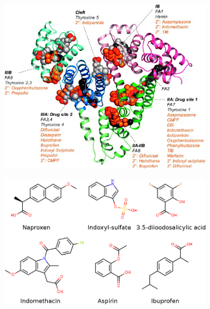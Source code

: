 \documentclass[10pt,final]{article}
\begin{document}
\begin{figure}[H]
\centering
\begin{subfigure}{.49\textwidth}
	\centering
	\includegraphics[width=0.9\linewidth]{figures/hsa_fig7_ghuman2005.jpg}
	\caption{
      }
	\label{figure:albumin}
	\end{subfigure}
	\hfill{}
 	\begin{subfigure}{.49\textwidth}
	  \centering	
	  \includegraphics[width=0.9\linewidth]{figures/hsa_compounds.png}
	  \caption{}
	  \label{figure:hsa-compounds}
 	\end{subfigure}

\end{figure}
\end{document}
